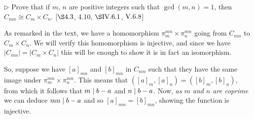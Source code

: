\begin{exercise}
	$\triangleright$ Prove that if $m$, $n$ are positive integers such that $\gcd(m,n) = 1$, then $C_{mn} \cong C_m \times C_n$. [$\S 4.3$, 4.10, $\S\RNo{4}.6.1$, $\RNo{5}.6.8$]
\end{exercise}
\begin{solution}
	As remarked in the text, we have a homomorphism $\pi_m^{mn}\times \pi_n^{mn}$ going from $C_{mn}$ to $C_m\times C_n$. We will verify this homomorphism is injective, and since we have $|C_{mn}| = |C_m \times C_n|$ this will be enough to show it is in fact an isomorphism.
	
	So, suppose we have $[a]_{mn}$ and $[b]_{mn}$ in $C_{mn}$ such that they have the same image under $\pi_m^{mn}\times \pi_n^{mn}$. This means that $([a]_m,[a]_n) = ([b]_m,[b]_n)$, from which it follows that $m\mid b-a$ and $n \mid b-a$. Now, \emph{as $m$ and $n$ are coprime} we can deduce $mn \mid b-a$ and so $[a]_{mn} = [b]_{mn}$, showing the function is injective.
\end{solution}

